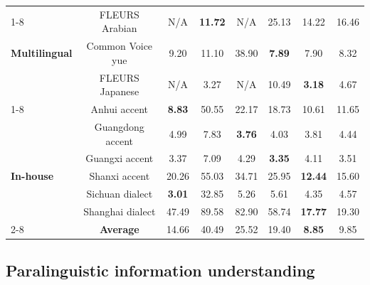 \begin{table}[htb]
\begin{tabular}{lccccccc}
\cmidrule(r){1-8}
& FLEURS Arabian & N/A & \textbf{11.72} & N/A & 25.13 & 14.22 & 16.46\\
\textbf{Multilingual}& Common Voice yue & 9.20 & 11.10 & 38.90 & \textbf{7.89} & 7.90 & 8.32\\
& FLEURS Japanese & N/A & 3.27 & N/A & 10.49 & \textbf{3.18} & 4.67\\
\cmidrule(r){1-8}
 & Anhui accent & \textbf{8.83} & 50.55 & 22.17 & 18.73 & 10.61 & 11.65\\
 & Guangdong accent & 4.99 & 7.83 & \textbf{3.76} & 4.03 & 3.81 & 4.44\\
 & Guangxi accent & 3.37 & 7.09 & 4.29 & \textbf{3.35} & 4.11 & 3.51\\
\textbf{In-house} & Shanxi accent & 20.26 & 55.03 & 34.71 & 25.95 & \textbf{12.44} & 15.60\\
 & Sichuan dialect & \textbf{3.01} & 32.85 & 5.26 & 5.61 & 4.35 & 4.57\\
& Shanghai dialect & 47.49 & 89.58 & 82.90 & 58.74 & \textbf{17.77} & 19.30\\
\cmidrule(lr){2-8}
& \textbf{Average} & 14.66 & 40.49 & 25.52 & 19.40 & \textbf{8.85} & 9.85\\
\bottomrule
\end{tabular}
\end{table}

\newpage
\subsection{Paralinguistic information understanding}

